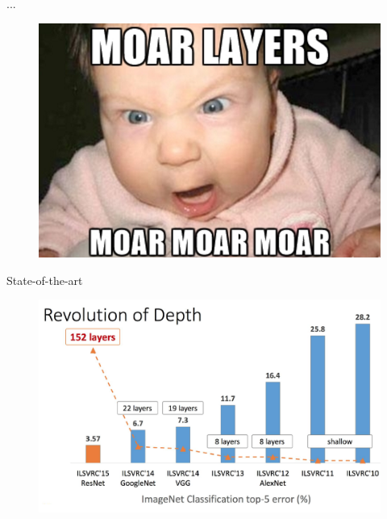 \documentclass{beamer}
\begin{document}
\begin{frame}{...}

\begin{figure}[h!]
  \centering
  \includegraphics[width=1\textwidth]{images/moar.png}
\end{figure}

\end{frame}


\begin{frame}{State-of-the-art}

\begin{figure}[h!]
  \centering
  \includegraphics[width=1\textwidth]{images/rev_depth.png}
\end{figure}

\end{frame}
\end{document}
